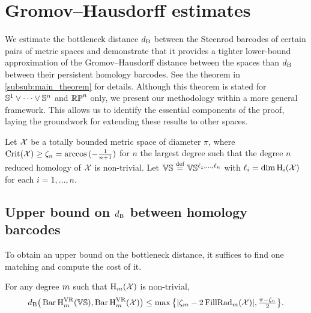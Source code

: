 
\section{Gromov--Hausdorff estimates}\label{prop:db estimate}

We estimate the bottleneck distance $\db$ between the Steenrod barcodes of certain pairs of metric spaces and demonstrate that it provides a tighter lower-bound approximation of the Gromov–Hausdorff distance between the spaces than $\db$ between their persistent homology barcodes.
See the theorem in \cref{subsub:main_theorem} for details.
Although this theorem is stated for $\bS^1\vee\dots\vee \bS^n$ and $\rp^n$ only, we present our methodology within a more general framework.
This allows us to identify the essential components of the proof, laying the groundwork for extending these results to other spaces.

Let $\cX$ be a totally bounded metric space of diameter $\pi$, 
where $\crit(\cX) \geq \zeta_n = \arccos{(-\tfrac{1}{n+1})}$ for $n$ the largest degree such that the degree $n$ reduced homology of $\cX$ is non-trivial.
Let $\VS \defeq \VS^{\ell_1, \dots, \ell_n}$ with $\ell_i = \dim \opH_i(\cX)$ for each $i=1, \dots, n$.


\subsection{Upper bound on $\db$ between homology barcodes}
\label{subsub:db_upper_bound}

To obtain an upper bound on the bottleneck distance, it suffices to find one matching and compute the cost of it.

\medskip\proposition
For any degree $\degp$ such that $\opH_\degp(\cX)$ is non-trivial,
\begin{equation}\label{eq:db_usual_upper_bound}
	\db\big(\Hbarc[\field]{\degp}{\VS}, \Hbarc[\field]{\degp}{\cX}\big)
	\leq \max\big\{|\zeta_\degp  - 2\firstdeath{m}{\cX} |, \tfrac{\pi - \zeta_n}{2}\big\}.
\end{equation}

